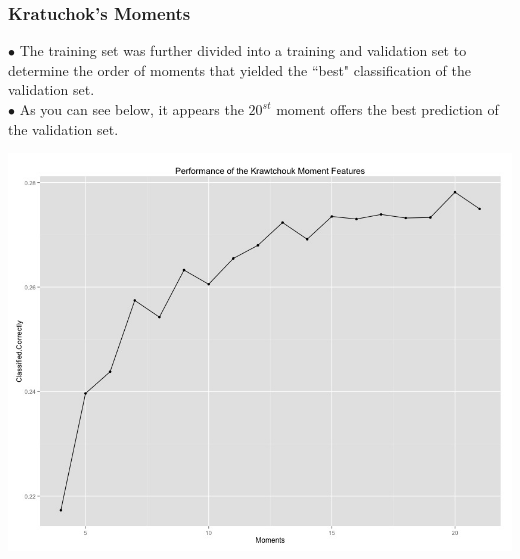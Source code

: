 \documentclass{beamer}
\begin{document}

\begin{frame}
\frametitle{Kratuchok's Moments}
$\bullet$ The training set was further divided into a training and validation set to determine the order of moments that yielded the ``best" classification of the validation set. \\
$\bullet$ As you can see below, it appears the $20^{st}$ moment offers the best prediction of the validation set.
	\begin{center}
		\includegraphics[scale=0.20]{PerfPlot.jpeg}
	\end{center}
\end{frame}

\end{document}
